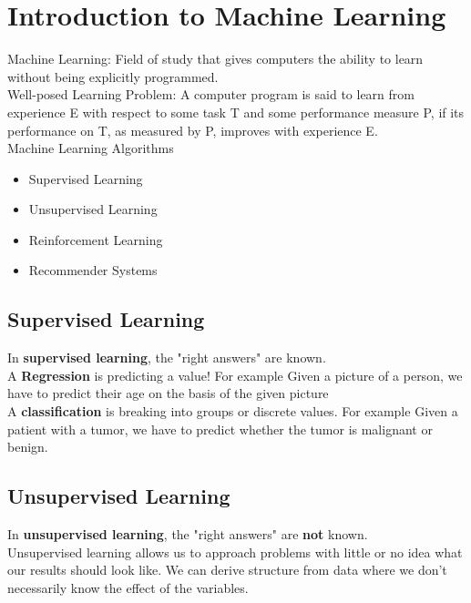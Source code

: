 \section{Introduction to Machine Learning}


Machine Learning: Field of study that gives computers the ability to learn without being explicitly programmed. \\

Well-posed Learning Problem: A computer program is said to learn from experience E with respect to some task T and some performance measure P, if its performance on T, as measured by P, improves with experience E. \\

Machine Learning Algorithms
\begin{itemize}
\item Supervised Learning
\item Unsupervised Learning
\item Reinforcement Learning
\item Recommender Systems
\end{itemize}


\subsection{Supervised Learning}


In \textbf{supervised learning}, the "right answers" are known.\\

A \textbf{Regression} is predicting a value! For example Given a picture of a person, we have to predict their age on the basis of the given picture\\

A \textbf{classification} is breaking into groups or discrete values.  For example Given a patient with a tumor, we have to predict whether the tumor is malignant or benign.\\


\subsection{Unsupervised Learning}

In \textbf{unsupervised learning}, the "right answers" are \textbf{not} known.\\

Unsupervised learning allows us to approach problems with little or no idea what our results should look like. We can derive structure from data where we don't necessarily know the effect of the variables.\\

